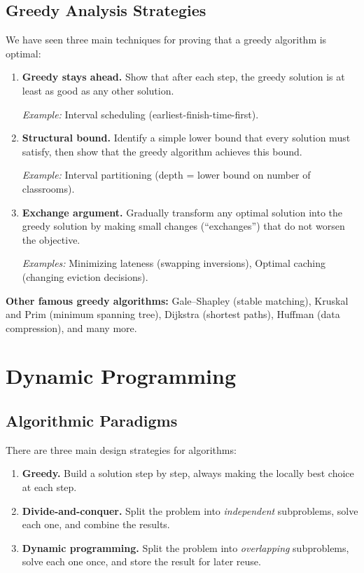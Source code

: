 \documentclass[12pt,a4paper]{report}
\begin{document}
\section{Greedy Analysis Strategies}

We have seen three main techniques for proving that a greedy algorithm is optimal:

\begin{enumerate}
    \item \textbf{Greedy stays ahead.} Show that after each step, the greedy solution is at least
    as good as any other solution.

    \emph{Example:} Interval scheduling (earliest-finish-time-first).

    \item \textbf{Structural bound.} Identify a simple lower bound that every solution must satisfy,
    then show that the greedy algorithm achieves this bound.

    \emph{Example:} Interval partitioning (depth = lower bound on number of classrooms).

    \item \textbf{Exchange argument.} Gradually transform any optimal solution into the greedy
    solution by making small changes (``exchanges'') that do not worsen the objective.

    \emph{Examples:} Minimizing lateness (swapping inversions), Optimal caching (changing eviction
    decisions).
\end{enumerate}

\textbf{Other famous greedy algorithms:} Gale--Shapley (stable matching), Kruskal and Prim (minimum
spanning tree), Dijkstra (shortest paths), Huffman (data compression), and many more.

\chapter{ Dynamic Programming}

\section{Algorithmic Paradigms}

There are three main design strategies for algorithms:

\begin{enumerate}
    \item \textbf{Greedy.} Build a solution step by step, always making the locally best
    choice at each step.
    \item \textbf{Divide-and-conquer.} Split the problem into \emph{independent}
    subproblems, solve each one, and combine the results.
    \item \textbf{Dynamic programming.} Split the problem into \emph{overlapping}
    subproblems, solve each one once, and store the result for later reuse.
\end{enumerate}
\end{document}
